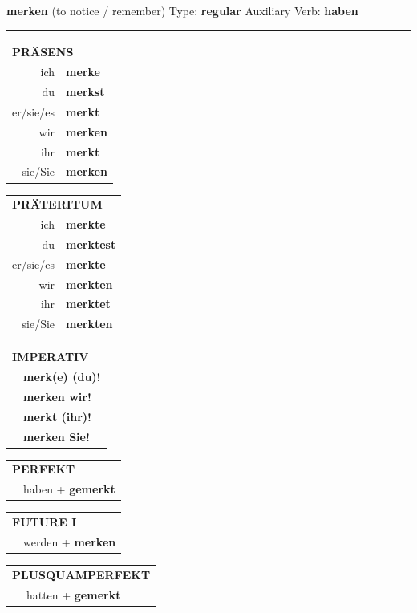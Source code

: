 \documentclass[10pt,a4paper]{revtex4-2}
\begin{document}
\begin{verbbox}
{\Large \bf merken} (to notice / remember) \hfill Type: \textbf{regular} \hfill Auxiliary Verb: \textbf{haben}

\vspace{5pt}
\hrule
\vspace{5pt}

\begin{tabular}{rl}
\multicolumn{2}{l}{\textbf{PRÄSENS}}\\
ich & \textbf{merke}\\
du & \textbf{merkst}\\
er/sie/es & \textbf{merkt}\\
wir & \textbf{merken}\\
ihr & \textbf{merkt}\\
sie/Sie & \textbf{merken}\\
\end{tabular}
\hfill
\begin{tabular}{rl}
\multicolumn{2}{l}{\textbf{PRÄTERITUM}}\\
ich & \textbf{merkte}\\
du & \textbf{merktest}\\
er/sie/es & \textbf{merkte}\\
wir & \textbf{merkten}\\
ihr & \textbf{merktet}\\
sie/Sie & \textbf{merkten}\\
\end{tabular}
\hfill
\begin{tabular}{rl}
\multicolumn{2}{l}{\textbf{IMPERATIV}}\\
& \textbf{merk(e) (du)!}\\
& \textbf{merken wir!}\\
& \textbf{merkt (ihr)!}\\
& \textbf{merken Sie!}\\
\end{tabular}

\vspace{10pt}

\begin{tabular}{rl}
\multicolumn{2}{l}{\textbf{PERFEKT}}\\
& haben + \textbf{gemerkt}\\
\end{tabular}
\hfill
\begin{tabular}{rl}
\multicolumn{2}{l}{\textbf{FUTURE I}}\\
& werden + \textbf{merken}\\
\end{tabular}
\hfill
\begin{tabular}{rl}
\multicolumn{2}{l}{\textbf{PLUSQUAMPERFEKT}}\\
& hatten + \textbf{gemerkt}\\
\end{tabular}


\end{verbbox}
\end{document}
